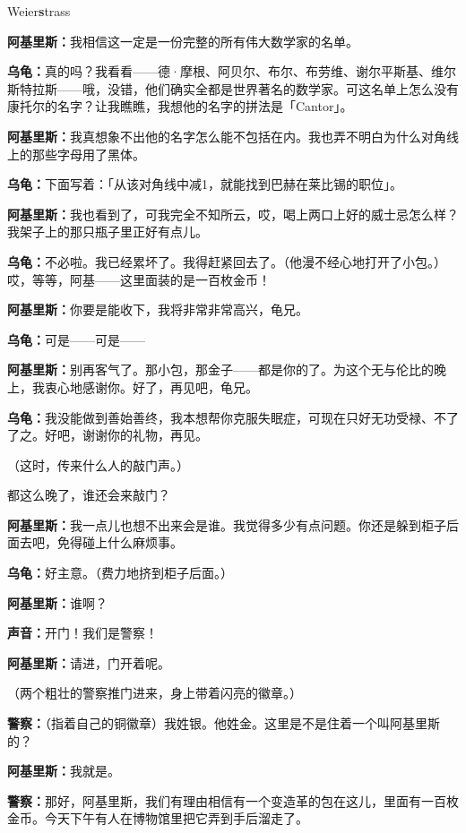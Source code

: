 \documentclass[
  12pt,
  twoside,
  openright,
  oldfontcommands,
]{memoir}
\newcommand{\kaitismall}[1]{{\kaitifamily\small #1}}
\newcommand{\heititext}[1]{{\heifamily\bfseries #1}}
\newcommand{\dialogname}[1]{{\heifamily\bfseries #1}}
\begin{document}
Weier\heititext{s}trass

\dialogname{阿基里斯：}我相信这一定是一份完整的所有伟大数学家的名单。

\dialogname{乌龟：}真的吗？我看看------德·摩根、阿贝尔、布尔、布劳维、谢尔平斯基、维尔斯特拉斯------哦，没错，他们确实全都是世界著名的数学家。可这名单上怎么没有康托尔的名字？让我瞧瞧，我想他的名字的拼法是「Cantor」。

\dialogname{阿基里斯：}我真想象不出他的名字怎么能不包括在内。我也弄不明白为什么对角线上的那些字母用了黑体。

\dialogname{乌龟：}下面写着：「从该对角线中减1，就能找到巴赫在莱比锡的职位」。

\dialogname{阿基里斯：}我也看到了，可我完全不知所云，哎，喝上两口上好的威士忌怎么样？我架子上的那只瓶子里正好有点儿。

\dialogname{乌龟：}不必啦。我已经累坏了。我得赶紧回去了。\kaitismall{（他漫不经心地打开了小包。）}哎，等等，阿基------这里面装的是一百枚金币！

\dialogname{阿基里斯：}你要是能收下，我将非常非常高兴，龟兄。

\dialogname{乌龟：}可是------可是------

\dialogname{阿基里斯：}别再客气了。那小包，那金子------都是你的了。为这个无与伦比的晚上，我衷心地感谢你。好了，再见吧，龟兄。

\dialogname{乌龟：}我没能做到善始善终，我本想帮你克服失眠症，可现在只好无功受禄、不了了之。好吧，谢谢你的礼物，再见。

（这时，传来什么人的敲门声。）

都这么晚了，谁还会来敲门？

\dialogname{阿基里斯：}我一点儿也想不出来会是谁。我觉得多少有点问题。你还是躲到柜子后面去吧，免得碰上什么麻烦事。

\dialogname{乌龟：}好主意。\kaitismall{（费力地挤到柜子后面。）}

\dialogname{阿基里斯：}谁啊？

\dialogname{声音：}开门！我们是警察！

\dialogname{阿基里斯：}请进，门开着呢。

（两个粗壮的警察推门进来，身上带着闪亮的徽章。）

\dialogname{警察：}\kaitismall{（指着自己的铜徽章）}我姓银。他姓金。这里是不是住着一个叫阿基里斯的？

\dialogname{阿基里斯：}我就是。

\dialogname{警察：}那好，阿基里斯，我们有理由相信有一个变造革的包在这儿，里面有一百枚金币。今天下午有人在博物馆里把它弄到手后溜走了。
\end{document}
